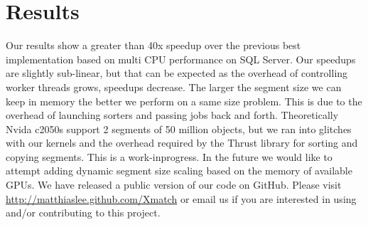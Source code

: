 \section{Results}
Our results show a greater than 40x speedup over the previous best implementation based on multi CPU performance on SQL Server. Our speedups are slightly sub-linear, but that can be expected as the overhead of controlling worker threads grows, speedups decrease. The larger the segment size we can keep in memory the better we perform on a same size problem. This is due to the overhead of launching sorters and passing jobs back and forth. Theoretically Nvida c2050s support 2 segments of 50 million objects, but we ran into glitches with our kernels and the overhead required by the Thrust library for sorting and copying segments. This is a work-inprogress. In the future we would like to attempt adding dynamic segment size scaling based on the memory of available GPUs. We have released a public version of our code on GitHub. Please visit \url{http://matthiaslee.github.com/Xmatch} or email us if you are interested in using and/or contributing to this project.



